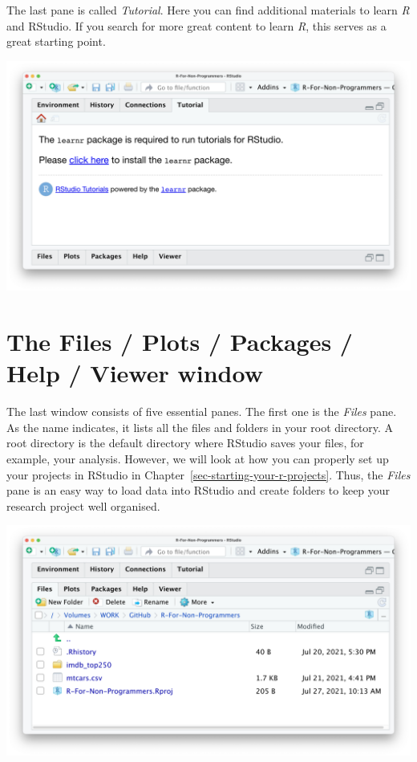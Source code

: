 \documentclass[
  letterpaper,
]{krantz}
\begin{document}
The last pane is called \emph{Tutorial}. Here you can find additional
materials to learn \emph{R} and RStudio. If you search for more great
content to learn \emph{R}, this serves as a great starting point.

\includegraphics{images/chapter_04_img/04_environment_history_etc/04_rstudio_tutorial.png}

\section{The Files / Plots / Packages / Help / Viewer
window}\label{sec-the-files-plots-packages-help-viewer-window}

The last window consists of five essential panes. The first one is the
\emph{Files} pane. As the name indicates, it lists all the files and
folders in your root directory. A root directory is the default
directory where RStudio saves your files, for example, your analysis.
However, we will look at how you can properly set up your projects in
RStudio in Chapter~\ref{sec-starting-your-r-projects}. Thus, the
\emph{Files} pane is an easy way to load data into RStudio and create
folders to keep your research project well organised.

\includegraphics{images/chapter_04_img/05_files_plots_etc/01_rstudio_files.png}
\end{document}
